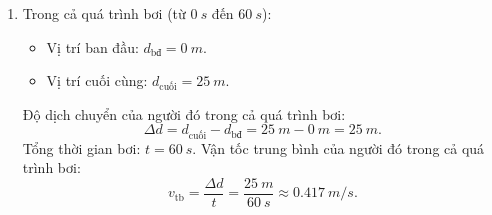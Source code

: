 \begin{ex}
{\begin{enumerate}[label=\alph*)]
			\begin{itemize}
				\item Tại $t=\SI{40}{s}$, $d_1 = \SI{45}{m}$.
				\item Tại $t=\SI{60}{s}$, $d_2 = \SI{25}{m}$.
			\end{itemize}
			Trong 20 giây cuối, độ dịch chuyển thay đổi là $\Delta d = d_2 - d_1 = \SI{25}{m} - \SI{45}{m} = \SI{-20}{m}.$
			Quãng đường đi được trong 20 giây cuối: $s = |\Delta d| = |\SI{-20}{m}| = \SI{20}{m}.$
			Mỗi giây người đó bơi được (tốc độ):
			$$\dfrac{\SI{20}{m}}{\SI{20}{s}} = \SI{1}{m/s}.$$
			Vận tốc của người đó trong 20 giây cuối là:
			$$v = \dfrac{\Delta d}{\Delta t} = \dfrac{\SI{25}{m} - \SI{45}{m}}{\SI{60}{s} - \SI{40}{s}} = \dfrac{\SI{-20}{m}}{\SI{20}{s}} = \SI{-1}{m/s}.$$
			\item Trong cả quá trình bơi (từ $\SI{0}{s}$ đến $\SI{60}{s}$):
			\begin{itemize}
				\item Vị trí ban đầu: $d_{\text{bđ}} = \SI{0}{m}$.
				\item Vị trí cuối cùng: $d_{\text{cuối}} = \SI{25}{m}$.
			\end{itemize}
			Độ dịch chuyển của người đó trong cả quá trình bơi:
			$$\Delta d = d_{\text{cuối}} - d_{\text{bđ}} = \SI{25}{m} - \SI{0}{m} = \SI{25}{m}.$$
			Tổng thời gian bơi: $t = \SI{60}{s}$.
			Vận tốc trung bình của người đó trong cả quá trình bơi:
			$$v_{\text{tb}} = \dfrac{\Delta d}{t} = \dfrac{\SI{25}{m}}{\SI{60}{s}} \approx \SI{0.417}{m/s}.$$
		\end{enumerate}
	}
\end{ex}
